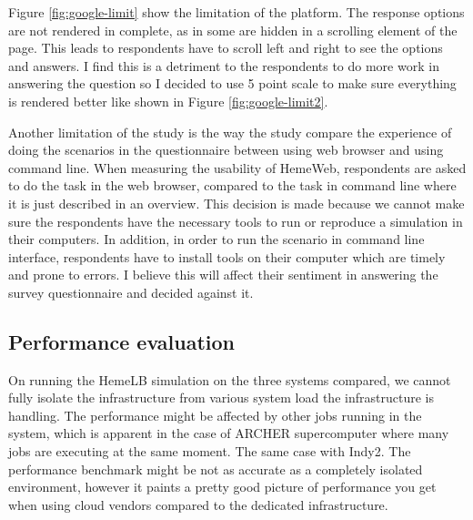 \vspace{1cm}


Figure \ref{fig:google-limit} show the limitation of the platform. The response options are not rendered in complete, as in some are hidden in a scrolling element of the page. This leads to respondents have to scroll left and right to see the options and answers. I find this is a detriment to the respondents to do more work in answering the question so I decided to use 5 point scale to make sure everything is rendered better like shown in Figure \ref{fig:google-limit2}.


Another limitation of the study is the way the study compare the experience of doing the scenarios in the questionnaire between using web browser and using command line.  When measuring the usability of HemeWeb, respondents are asked to do the task in the web browser, compared to the task in command line where it is just described in an overview. This decision is made because we cannot make sure the respondents have the necessary tools to run or reproduce a simulation in their computers.  In addition, in order to run the scenario in command line interface, respondents have to install tools on their computer which are timely and prone to errors. I believe this will affect their sentiment in answering the survey questionnaire and decided against it.


\subsection{Performance evaluation}

On running the HemeLB simulation on the three systems compared, we cannot fully isolate the infrastructure from various system load the infrastructure is handling. The performance might be affected by other jobs running in the system, which is apparent in the case of ARCHER supercomputer where many jobs are executing at the same moment. The same case with Indy2. The performance benchmark might be not as accurate as a completely isolated environment, however it paints a pretty good picture of performance you get when using cloud vendors compared to the dedicated infrastructure. 
 

